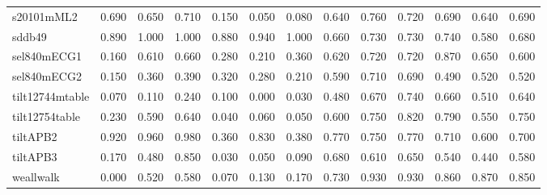 \begin{tabular}{lrrrrrrrrrrrr}
s20101mML2 & 0.690 & 0.650 & 0.710 & 0.150 & 0.050 & 0.080 & 0.640 & 0.760 & 0.720 & 0.690 & 0.640 & 0.690 \\
sddb49 & 0.890 & 1.000 & 1.000 & 0.880 & 0.940 & 1.000 & 0.660 & 0.730 & 0.730 & 0.740 & 0.580 & 0.680 \\
sel840mECG1 & 0.160 & 0.610 & 0.660 & 0.280 & 0.210 & 0.360 & 0.620 & 0.720 & 0.720 & 0.870 & 0.650 & 0.600 \\
sel840mECG2 & 0.150 & 0.360 & 0.390 & 0.320 & 0.280 & 0.210 & 0.590 & 0.710 & 0.690 & 0.490 & 0.520 & 0.520 \\
tilt12744mtable & 0.070 & 0.110 & 0.240 & 0.100 & 0.000 & 0.030 & 0.480 & 0.670 & 0.740 & 0.660 & 0.510 & 0.640 \\
tilt12754table & 0.230 & 0.590 & 0.640 & 0.040 & 0.060 & 0.050 & 0.600 & 0.750 & 0.820 & 0.790 & 0.550 & 0.750 \\
tiltAPB2 & 0.920 & 0.960 & 0.980 & 0.360 & 0.830 & 0.380 & 0.770 & 0.750 & 0.770 & 0.710 & 0.600 & 0.700 \\
tiltAPB3 & 0.170 & 0.480 & 0.850 & 0.030 & 0.050 & 0.090 & 0.680 & 0.610 & 0.650 & 0.540 & 0.440 & 0.580 \\
weallwalk & 0.000 & 0.520 & 0.580 & 0.070 & 0.130 & 0.170 & 0.730 & 0.930 & 0.930 & 0.860 & 0.870 & 0.850 \\
\bottomrule
\end{tabular}
